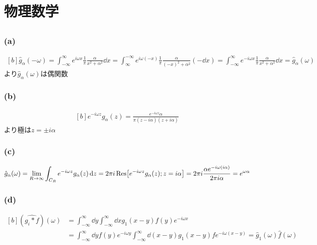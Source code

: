 \documentclass[../../sp_2023.tex]{subfiles}
\begin{document}
\setcounter{section}{3}
\section{物理数学}
\subsection{}
\subsubsection{(a)}
\begin{equation}\begin{aligned}[b]
    \hat{g}_\alpha(-\omega)=\int_{-\infty}^{\infty}e^{i\omega x}\frac{1}{\pi}\frac{\alpha}{x^2+\alpha^2}\dd{x}
    = \int_{\infty}^{-\infty}e^{i\omega (-x)}\frac{1}{\pi}\frac{\alpha}{(-x)^2+\alpha^2}(-\dd{x})
    = \int_{-\infty}^{\infty}e^{-i\omega x}\frac{1}{\pi}\frac{\alpha}{x^2+\alpha^2}\dd{x}
    =\hat{g}_\alpha(\omega)
\end{aligned}\end{equation}
より\(\hat{g}_\alpha(\omega)\)は偶関数

\subsubsection{(b)}
\begin{equation}\begin{aligned}[b]
    e^{-i\omega z}g_\alpha(z) = \frac{e^{-i\omega z}\alpha}{\pi(z-i\alpha)(z+i\alpha)}
\end{aligned}\end{equation}
より極は\(z=\pm i\alpha\)

\subsubsection{(c)}
\begin{equation}\begin{aligned}[b]
    \hat{g}_\alpha(\omega)=\lim_{R\to\infty}\int_{C_R}e^{-i\omega z}g_\alpha(z)\dd{z}
    = 2\pi i\Res[e^{-i\omega z}g_\alpha(z);z=i\alpha]
    = 2\pi i \frac{\alpha e^{-i\omega (i\alpha)}}{2\pi i \alpha}=e^{\omega \alpha}
\end{aligned}\end{equation}

\subsubsection{(d)}
\begin{equation}\begin{aligned}[b]
    (\widehat{g_i* f})(\omega)
    &= \int_{-\infty}^{\infty}\dd{y}\int_{-\infty}^{\infty}\dd{x} g_1(x-y)f(y)e^{-i\omega x}\\
    &= \int_{-\infty}^{\infty}\dd{y}f(y)e^{-i\omega y}\int_{-\infty}^{\infty}\dd{(x-y)} g_1(x-y)fe^{-i\omega (x-y)}
    = \hat{g}_1(\omega)\hat{f}(\omega)
\end{aligned}\end{equation}
\end{document}
